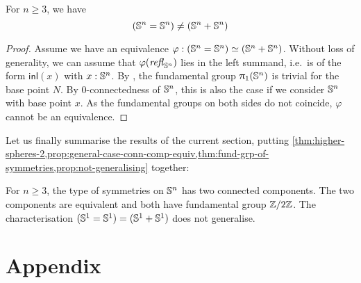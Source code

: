 \documentclass[english,a4]{article}
\begin{document}
\begin{proposition}\label{prop:not-generalising}
    For $n \geq 3$, we have
    \begin{equation}
    ({\mathbb S^{n}} = {\mathbb S^{n}}) \not= ({\mathbb S^{n}} + {\mathbb S^{n}})
    \end{equation}
\end{proposition}
\begin{proof}
    Assume we have an equivalence $\varphi : ({\mathbb S^{n}} = {\mathbb S^{n}}) \simeq ({\mathbb S^{n}} + {\mathbb S^{n}})$.
    Without loss of generality, we can assume that $\varphi(\mathop{{\mathit{refl}}_{{\mathbb S^{n}}}})$ lies in the left summand, 
    i.e.\ is of the form $\mathsf{inl}(x)$ with $x : {\mathbb S^{n}}$. 
    By \cite{HoTT}, the fundamental group $\uppi_{1}({\mathbb S^{n}})$ is trivial for the base point $N$. By $0$-connectedness of ${\mathbb S^{n}}$, this is also the case if we consider ${\mathbb S^{n}}$ with base point $x$.
    As the fundamental groups on both sides do not coincide, $\varphi$ cannot be an equivalence.
\end{proof}

Let us finally summarise the results of the current section, putting \cref{thm:higher-spheres-2,prop:general-case-conn-comp-equiv,thm:fund-grp-of-symmetries,prop:not-generalising} together:

\begin{theorem}
    For $n \geq 3$, the type of symmetries on ${\mathbb S^{n}}$ has two connected components. The two components are equivalent and both have fundamental group $\mathbb{Z} \slash 2\mathbb{Z}$.
    The characterisation $({\mathbb S^{1}} = {\mathbb S^{1}}) = ({\mathbb S^{1}} + {\mathbb S^{1}})$ does not generalise.
\end{theorem}

\section{Appendix}
\label{sec:appendix}
\end{document}
